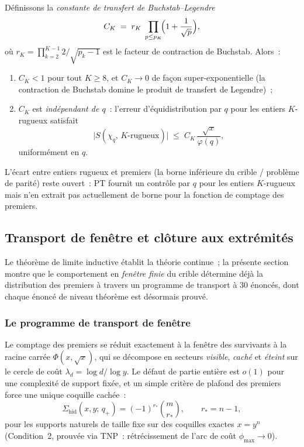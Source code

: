 \documentclass[12pt,a4paper]{article}
\begin{document}
\begin{proposition}
\label{prop:CK_uniform}
Définissons la \emph{constante de transfert de Buchstab--Legendre}
\begin{equation}
  C_K \;=\; r_K \;\prod_{p \leq p_K}\!\Bigl(1 + \frac{1}{\sqrt{p}}\Bigr),
  \label{eq:CK_def}
\end{equation}
où $r_K = \prod_{k=2}^{K-1} 2/\!\sqrt{p_k-1}$ est le facteur de
contraction de Buchstab. Alors~:
\begin{enumerate}[nosep]
\item $C_K < 1$ pour tout $K \geq 8$, et $C_K \to 0$ de façon
  super-exponentielle (la contraction de Buchstab domine le
  produit de transfert de Legendre)~;
\item $C_K$ est \emph{indépendant de $q$}~: l'erreur
  d'équidistribution par $q$ pour les entiers $K$-rugueux satisfait
  \[
    \bigl|S(\chi_q,\,K\text{-rugueux})\bigr|
    \;\leq\; C_K\,\frac{\sqrt{x}}{\varphi(q)},
  \]
  uniformément en $q$.
\end{enumerate}
L'écart entre entiers rugueux et premiers (la borne inférieure
du crible / problème de parité) reste ouvert~: PT fournit un
contrôle par $q$ pour les entiers $K$-rugueux mais n'en extrait
pas actuellement de borne pour la fonction de comptage des
premiers.
\end{proposition}

\subsection{Transport de fenêtre et clôture aux extrémités}
\label{sec:ch9_window_transport}

Le théorème de limite inductive établit la théorie continue~; la
présente section montre que le comportement en \emph{fenêtre
finie} du crible détermine déjà la distribution des premiers
à travers un programme de transport à 30 énoncés, dont chaque
énoncé de niveau théorème est désormais prouvé.

\subsubsection{Le programme de transport de fenêtre}

Le comptage des premiers se réduit exactement à la fenêtre des
survivants à la racine carrée $\Phi(x,\sqrt{x})$, qui se décompose
en secteurs \emph{visible}, \emph{caché} et \emph{éteint} sur le
cercle de coût $\lambda_d = \log d/\log y$. Le défaut de partie
entière est $o(1)$ pour une complexité de support fixée, et un
simple critère de plafond des premiers force une unique coquille
cachée~:
\begin{equation}
  \Sigma_{\text{hid}}(x,y;\,q_+)
  = (-1)^{r_*}\binom{m}{r_*},
  \qquad r_* = n - 1,
  \label{eq:one_shell}
\end{equation}
pour les supports naturels de taille fixe sur des coquilles
exactes $x = y^n$ (Condition~2, prouvée via TNP~:
rétrécissement de l'arc de coût $\phi_{\max}\to 0$).
\end{document}
